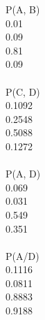 \documentclass[a4paper,10pt]{report}
\begin{document}
P(A, B)\\
0.01\\
0.09\\
0.81\\
0.09\\\\
P(C, D)\\
0.1092 \\
0.2548\\
0.5088\\
0.1272\\\\
P(A, D)\\
0.069\\
0.031 \\
0.549\\
0.351\\\\
P(A/D)\\
0.1116\\
0.0811 \\
0.8883\\
0.9188
\end{document}
